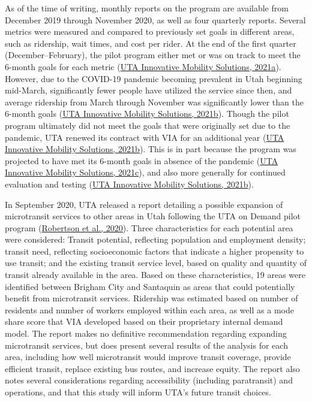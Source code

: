 \documentclass[
]{report}
\begin{document}
As of the time of writing, monthly reports on the program are available from December 2019 through November 2020, as well as four quarterly reports. Several metrics were measured and compared to previously set goals in different areas, such as ridership, wait times, and cost per rider. At the end of the first quarter (December--February), the pilot program either met or was on track to meet the 6-month goals for each metric (\protect\hyperlink{ref-UTAevalQ1}{UTA Innovative Mobility Solutions, 2021a}). However, due to the COVID-19 pandemic becoming prevalent in Utah beginning mid-March, significantly fewer people have utilized the service since then, and average ridership from March through November was significantly lower than the 6-month goals (\protect\hyperlink{ref-UTAevalQ3}{UTA Innovative Mobility Solutions, 2021b}). Though the pilot program ultimately did not meet the goals that were originally set due to the pandemic, UTA renewed its contract with VIA for an additional year (\protect\hyperlink{ref-UTAevalQ3}{UTA Innovative Mobility Solutions, 2021b}). This is in part because the program was projected to have met its 6-month goals in absence of the pandemic (\protect\hyperlink{ref-UTAevalQ2}{UTA Innovative Mobility Solutions, 2021c}), and also more generally for continued evaluation and testing (\protect\hyperlink{ref-UTAevalQ3}{UTA Innovative Mobility Solutions, 2021b}).

In September 2020, UTA released a report detailing a possible expansion of microtransit services to other areas in Utah following the UTA on Demand pilot program (\protect\hyperlink{ref-UTAreport}{Robertson et al., 2020}). Three characteristics for each potential area were considered: Transit potential, reflecting population and employment density; transit need, reflecting socioeconomic factors that indicate a higher propensity to use transit; and the existing transit service level, based on quality and quantity of transit already available in the area. Based on these characteristics, 19 areas were identified between Brigham City and Santaquin as areas that could potentially benefit from microtransit services. Ridership was estimated based on number of residents and number of workers employed within each area, as well as a mode share score that VIA developed based on their proprietary internal demand model. The report makes no definitive recommendation regarding expanding microtransit services, but does present several results of the analysis for each area, including how well microtransit would improve transit coverage, provide efficient transit, replace existing bus routes, and increase equity. The report also notes several considerations regarding accessibility (including paratransit) and operations, and that this study will inform UTA's future transit choices.
\end{document}
